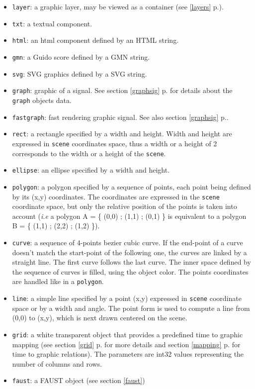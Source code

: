 \documentclass[a4paper,twoside]{report}
\newcommand{\fullref}[1]	{\ref{#1} p.\pageref{#1}}
\newcommand{\OSC}[1]		{\texttt{#1}}
\begin{document}
\begin{itemize}
\item \OSC{layer}: a graphic layer, may be viewed as a container (see \fullref{layers}).
\item \OSC{txt}: a textual component.
\item \OSC{html}: an html component defined by an HTML string.
\item \OSC{gmn}: a Guido score defined by a GMN string.
\item \OSC{svg}: SVG graphics defined by a SVG string.
\item \OSC{graph}: graphic of a signal. See section \fullref{graphsig} for details about the \OSC{graph} objects data.
\item \OSC{fastgraph}: fast rendering graphic signal. See also section \fullref{graphsig}.
\item \OSC{rect}: a rectangle specified by a width and height. Width and height are expressed in \OSC{scene} coordinates space, thus a width or a height of 2 corresponds to the width or a height of the \OSC{scene}.
\item \OSC{ellipse}: an ellipse specified by a width and height.
\item \OSC{polygon}: a polygon specified by a sequence of points, each point being defined by its (x,y) coordinates. The coordinates are expressed in the \OSC{scene} coordinate space, but only the relative position of the points is taken into account (\emph{i.e} a polygon A = \{ (0,0) ; (1,1) ; (0,1) \} is equivalent to a polygon B = \{ (1,1) ; (2,2) ; (1,2) \}).
\item \OSC{curve}: a sequence of 4-points bezier cubic curve. If the end-point of a curve doesn't match the start-point of the following one, the curves are linked by a straight line. The first curve follows the last curve. The inner space defined by the sequence of curves is filled, using the object color. The points coordinates are handled like in a \OSC{polygon}.
\item \OSC{line}: a simple line specified by a point (x,y) expressed in \OSC{scene} coordinate space or by a width and angle. The point form is used to compute a line from (0,0) to (x,y), which is next drawn centered on the scene.
\item \OSC{grid}: a white transparent object that provides a predefined time to graphic mapping (see section \fullref{grid} for more details and section \fullref{mapping} for time to graphic relations). The parameters are int32 values representing the number of columns and rows.

\item \OSC{faust}: a FAUST object (see section \ref{faust})
\end{itemize}
\end{document}
